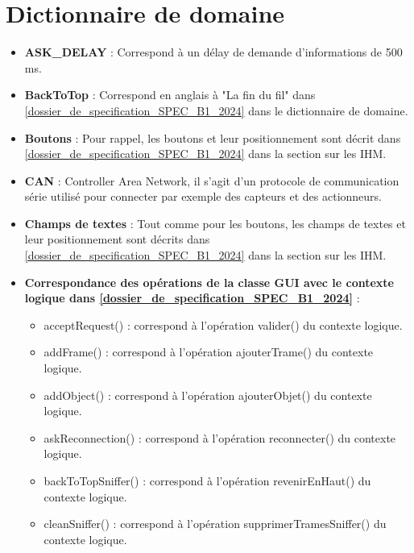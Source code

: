 \newpage
\section{Dictionnaire de domaine} \label{dictionnaire}

\begin{itemize}  
    \item \textbf{ASK\_DELAY} : Correspond à un délay de demande d'informations de 500 ms. \newline
    \item \textbf{BackToTop} : Correspond en anglais à "La fin du fil" dans \hyperref[SPEC]{[dossier\_de\_specification\_SPEC\_B1\_2024]} dans le dictionnaire de domaine.\newline
    \item \textbf{Boutons} : Pour rappel, les boutons et leur positionnement sont décrit dans \hyperref[SPEC]{[dossier\_de\_specification\_SPEC\_B1\_2024]} dans la section sur les IHM. \newline
    \item \textbf{CAN} : Controller Area Network, il s'agit d'un protocole de communication série utilisé pour connecter par exemple des capteurs et des actionneurs.\newline
    \item \textbf{Champs de textes} : Tout comme pour les boutons, les champs de textes et leur positionnement sont décrits dans \hyperref[SPEC]{[dossier\_de\_specification\_SPEC\_B1\_2024]} dans la section sur les IHM. \newline
    \item \textbf{Correspondance des opérations de la classe GUI avec le contexte logique dans \hyperref[SPEC]{[dossier\_de\_specification\_SPEC\_B1\_2024]}} : 
    \begin{itemize}
        \item acceptRequest() : correspond à l'opération valider() du contexte logique.
        \item addFrame() : correspond à l'opération ajouterTrame() du contexte logique.
        \item addObject() : correspond à l'opération ajouterObjet() du contexte logique.
        \item askReconnection() : correspond à l'opération reconnecter() du contexte logique.
        \item backToTopSniffer() : correspond à l'opération revenirEnHaut() du contexte logique.
        \item cleanSniffer() : correspond à l'opération supprimerTramesSniffer() du contexte logique.

\end{itemize}
\end{itemize}
